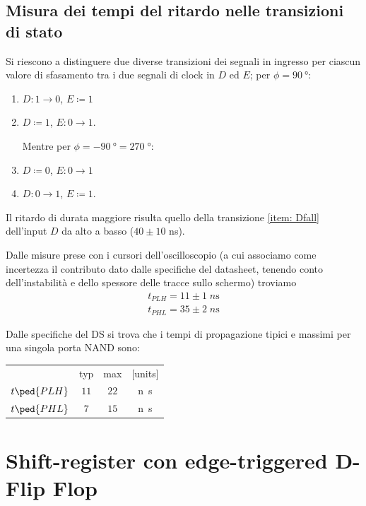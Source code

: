 \documentclass[10pt, a4paper, italian]{article}
\begin{document}
\subsection{Misura dei tempi del ritardo nelle transizioni di stato}
Si riescono a distinguere due diverse transizioni dei segnali in ingresso per
ciascun valore di sfasamento tra i due segnali di clock in $D$ ed $E$;
per $\phi = \SI{90}{\degree}$:
\begin{enumerate}
\item $D: 1 \to 0$, $E \coloneqq 1$ \label{item: Dfall}
\item $D \coloneqq 1$, $E: 0 \to 1$. \label{item: Erise}

Mentre per $\phi = - \SI{90}{\degree} = 270 \; \si{\degree}$:
\item $D \coloneqq 0$, $E: 0 \to 1$ \label{item: Efall}
\item $D: 0 \to 1$, $E \coloneqq 1$. \label{item: Drise}
\end{enumerate}

Il ritardo di durata maggiore risulta quello della transizione
\ref{item: Dfall} dell'input $D$ da alto a basso ($40 \pm 10$ ns).

Dalle misure prese con i cursori dell'oscilloscopio (a cui associamo come
incertezza il contributo dato dalle specifiche del datasheet, tenendo conto
dell'instabilità e dello spessore delle tracce sullo schermo) troviamo
\begin{align*}
    t_{PLH}= 11 \pm 1 \; \si{n\s} \\
    t_{PHL}= 35 \pm 2 \; \si{n\s}
\end{align*}

Dalle specifiche del DS si trova che i tempi di propagazione tipici e massimi
per una singola porta NAND sono:
\begin{table}[htbp]
\centering
\begin{tabular}{cccc}
	& typ & max & [units] \\
    $t\ped{PLH}$ & $11$ & $22$ & \si{n\s} \\
    $t\ped{PHL}$ & $7$ & $15$ & \si{n\s}
\end{tabular}
\end{table}

\section{Shift-register con edge-triggered D-Flip Flop}
\end{document}
